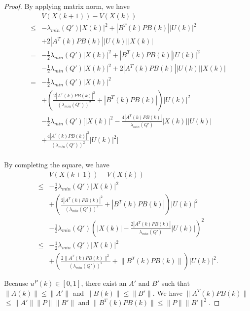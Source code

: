 \documentclass{sig-alternate}
\begin{document}
\begin{proof}
By applying matrix norm, we have
\begin{equation}
\begin{aligned}
& V( X(k+1) ) - V( X(k) ) \\
\leq & - \lambda_{min}(Q') | X(k) |^{2}  + | B^{T}(k) P B(k) | | U(k) |^{2} \\
& + 2  | A^{T}(k) P B(k) | | U(k) | | X(k) | \\
= & - \frac{1}{2} \lambda_{min}(Q') | X(k) |^{2} + | B^{T}(k) P B(k) | | U(k) |^{2} \\
& - \frac{1}{2} \lambda_{min}(Q') | X(k) |^{2} + 2  | A^{T}(k) P B(k) | | U(k) | | X(k) |  \\
= & - \frac{1}{2} \lambda_{min}(Q') | X(k) |^{2} \\
& + \left( \frac{2 | A^{T}(k) P B(k) |^{2}}{ ( \lambda_{min}(Q') )^{2} } + | B^{T}(k) P B(k) |  \right) | U(k) |^{2} \\
& - \frac{1}{2} \lambda_{min}(Q') [ | X(k) |^{2} - \frac{4 | A^{T}(k) P B(k) | }{ \lambda_{min}(Q') }  | X(k) | | U(k) | \\
& + \frac{4 | A^{T}(k) P B(k) |^{2}}{ ( \lambda_{min}(Q') )^{2} } | U(k) |^{2} ] \\
\end{aligned}
\end{equation}
		
By completing the square, we have
\begin{equation}
\label{eq:lyapunov_delta4}
\begin{aligned}
& V( X(k+1) ) - V( X(k) ) \\
\leq & - \frac{1}{2} \lambda_{min}(Q') | X(k) |^{2} \\
& + \left( \frac{2 | A^{T}(k) P B(k) |^{2}}{ ( \lambda_{min}(Q') )^{2} } + | B^{T}(k) P B(k) | \right) | U(k) |^{2} \\
& - \frac{1}{2} \lambda_{min}(Q') \left( | X(k) | - \frac{2 | A^{T}(k) P B(k) | }{ \lambda_{min}(Q') } | U(k) | \right)^{2} \\
	\leq & - \frac{1}{2} \lambda_{min}(Q') | X(k) |^{2} \\
 &	+ \left( \frac{2 \lVert A^{T}(k) P B(k) \rVert^{2}}{ ( \lambda_{min}(Q') )^{2} } 
	 + \lVert B^{T}(k) P B(k) \rVert \right) | U(k) |^{2}. 
\end{aligned}
\end{equation}
		
Because $ u^{P}(k) \in [0, 1] $, there exist an $ A' $ and $ B' $ such that $ \lVert A(k) \rVert \leq \lVert A' \rVert $ and $ \lVert B(k) \rVert \leq \lVert B' \rVert $.
We have $ \lVert A^{T}(k) P B(k) \rVert $ $  \leq \lVert A' \rVert \lVert P \rVert \lVert B' \rVert $ and $ \lVert B^{T}(k) P B(k) \rVert \leq \lVert P \rVert \lVert B' \rVert^{2} $.
		

\end{proof}
\end{document}

